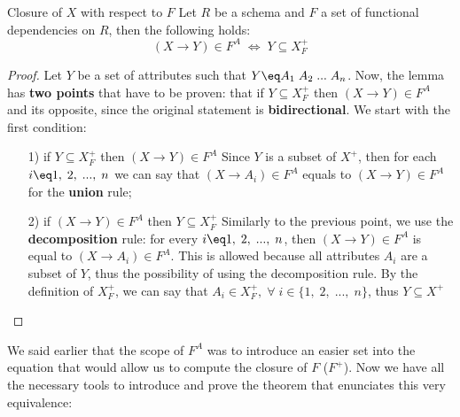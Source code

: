 \begin{lemma}{Closure of $X$ with respect to $F$}
    Let $R$ be a schema and $F$ a set of functional dependencies on $R$, then the following holds:
    \[ (X \rightarrow Y) \in F^A \; \Longleftrightarrow \; Y \subseteq X^+_F \]
    \begin{proof}
        Let $Y$ be a set of attributes such that $Y \eq A_1 \; A_2 \; ... \; A_n$. Now, the lemma has \textbf{two points} that have to be proven: that if $Y \subseteq X^+_F$ then $(X \rightarrow Y) \in F^A$ and its opposite, since the original statement is \textbf{bidirectional}. We start with the first condition:
        \begin{itemize}
            \item [1)] if $Y \subseteq X^+_F$ then $(X \rightarrow Y) \in F^A$\nwl
            Since $Y$ is a subset of $X^+$, then for each $i \eq 1, \; 2, \; ..., \; n$ we can say that $(X \rightarrow A_i) \in F^A$ equals to $(X \rightarrow Y) \in F^A$ for the \textbf{union} rule;\\
            \item [2)] if $(X \rightarrow Y) \in F^A$ then $Y \subseteq X^+_F$\nwl
            Similarly to the previous point, we use the \textbf{decomposition} rule: for every $i \eq 1, \; 2, \; ..., \; n$, then $(X \rightarrow Y) \in F^A$ is equal to $(X \rightarrow A_i) \in F^A$. This is allowed because all attributes $A_i$ are a subset of $Y$, thus the possibility of using the decomposition rule. By the definition of $X^+_F$, we can say that $A_i \in X^+_F, \; \forall \; i \in \{1, \; 2, \; ..., \; n\}$, thus $Y \subseteq X^+$
        \end{itemize}
    \end{proof}
\end{lemma}

We said earlier that the scope of $F^A$ was to introduce an easier set into the equation that would allow us to compute the closure of $F$ ($F^+$). Now we have all the necessary tools to introduce and prove the theorem that enunciates this very equivalence:

